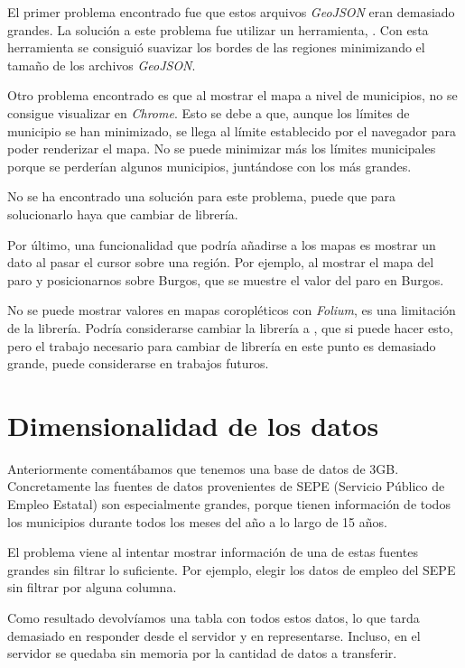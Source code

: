 El primer problema encontrado fue que estos arquivos \textit{GeoJSON} eran demasiado grandes. La solución a este problema fue utilizar un herramienta, . Con esta herramienta se consiguió suavizar los bordes de las regiones minimizando el tamaño de los archivos \textit{GeoJSON}.

Otro problema encontrado es que al mostrar el mapa a nivel de municipios, no se consigue visualizar en \textit{Chrome}. Esto se debe a que, aunque los límites de municipio se han minimizado, se llega al límite establecido por el navegador para poder renderizar el mapa. No se puede minimizar más los límites municipales porque se perderían algunos municipios, juntándose con los más grandes.

No se ha encontrado una solución para este problema, puede que para solucionarlo haya que cambiar de librería.

Por último, una funcionalidad que podría añadirse a los mapas es mostrar un dato al pasar el cursor sobre una región. Por ejemplo, al mostrar el mapa del paro y posicionarnos sobre Burgos, que se muestre el valor del paro en Burgos.

No se puede mostrar valores en mapas coropléticos con \textit{Folium}, es una limitación de la librería. Podría considerarse cambiar la librería a , que si puede hacer esto, pero el trabajo necesario para cambiar de librería en este punto es demasiado grande, puede considerarse en trabajos futuros.

\section{Dimensionalidad de los datos}

Anteriormente comentábamos que tenemos una base de datos de 3GB. Concretamente las fuentes de datos provenientes de SEPE (Servicio Público de Empleo Estatal) son especialmente grandes, porque tienen información de todos los municipios durante todos los meses del año a lo largo de 15 años.

El problema viene al intentar mostrar información de una de estas fuentes grandes sin filtrar lo suficiente. Por ejemplo, elegir los datos de empleo del SEPE sin filtrar por alguna columna.

Como resultado devolvíamos una tabla con todos estos datos, lo que tarda demasiado en responder desde el servidor y en representarse. Incluso, en el servidor se quedaba sin memoria por la cantidad de datos a transferir.

